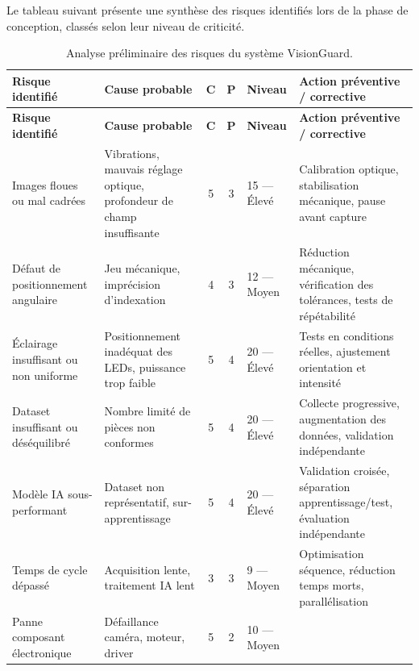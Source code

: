 Le tableau suivant présente une synthèse des risques identifiés lors de la phase de
conception, classés selon leur niveau de criticité.
\vspace{-0.5cm}
\renewcommand{\arraystretch}{1.3}
\setlength{\tabcolsep}{3pt}
\footnotesize
\begin{longtable}{|p{3cm}|p{3cm}|c|c|p{1.9cm}|p{7.4cm}|}
\caption{Analyse préliminaire des risques du système VisionGuard.}
\label{tab:risques} \\
\hline
\rowcolor{navyblue}
\textbf{\color{white}Risque identifié} & \textbf{\color{white}Cause probable} &
\textbf{\color{white}C} & \textbf{\color{white}P} &
\textbf{\color{white}Niveau} &
\textbf{\color{white}Action préventive / corrective} \\
\hline
\endfirsthead
\hline
\rowcolor{navyblue}
\textbf{\color{white}Risque identifié} & \textbf{\color{white}Cause probable} &
\textbf{\color{white}C} & \textbf{\color{white}P} &
\textbf{\color{white}Niveau} &
\textbf{\color{white}Action préventive / corrective} \\
\hline
\endhead
\hline
\endfoot
Images floues ou mal cadrées
    & Vibrations, mauvais réglage optique, profondeur de champ insuffisante
    & 5 & 3 & 15 — Élevé
    & Calibration optique, stabilisation mécanique, pause avant capture \\ \hline
Défaut de positionnement angulaire
    & Jeu mécanique, imprécision d'indexation
    & 4 & 3 & 12 — Moyen
    & Réduction mécanique, vérification des tolérances, tests de répétabilité \\ \hline
Éclairage insuffisant ou non uniforme
    & Positionnement inadéquat des LEDs, puissance trop faible
    & 5 & 4 & 20 — Élevé
    & Tests en conditions réelles, ajustement orientation et intensité \\ \hline
Dataset insuffisant ou déséquilibré
    & Nombre limité de pièces non conformes
    & 5 & 4 & 20 — Élevé
    & Collecte progressive, augmentation des données, validation indépendante \\ \hline
Modèle IA sous-performant
    & Dataset non représentatif, sur-apprentissage
    & 5 & 4 & 20 — Élevé
    & Validation croisée, séparation apprentissage/test, évaluation indépendante \\ \hline
Temps de cycle dépassé
    & Acquisition lente, traitement IA lent
    & 3 & 3 & 9 — Moyen
    & Optimisation séquence, réduction temps morts, parallélisation \\ \hline
Panne composant électronique
    & Défaillance caméra, moteur, driver
    & 5 & 2 & 10 — Moyen

\end{longtable}
